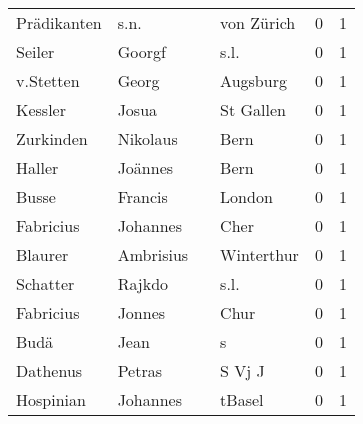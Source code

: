 \begin{center}
\begin{tiny}
\begin{longtabu}{llllrr}
              Prädikanten &                               s.n. &             &                                  von Zürich &          0 &         1 \\
                   Seiler &                             Goorgf &             &                                        s.l. &          0 &         1 \\
                v.Stetten &                              Georg &             &                                    Augsburg &          0 &         1 \\
                  Kessler &                              Josua &             &                                   St Gallen &          0 &         1 \\
                Zurkinden &                           Nikolaus &             &                                        Bern &          0 &         1 \\
                   Haller &                            Joännes &             &                                        Bern &          0 &         1 \\
                    Busse &                            Francis &             &                                      London &          0 &         1 \\
                Fabricius &                           Johannes &             &                                        Cher &          0 &         1 \\
                  Blaurer &                          Ambrisius &             &                                  Winterthur &          0 &         1 \\
                 Schatter &                             Rajkdo &             &                                        s.l. &          0 &         1 \\
                Fabricius &                             Jonnes &             &                                        Chur &          0 &         1 \\
                     Budä &                               Jean &             &                                           s &          0 &         1 \\
                 Dathenus &                             Petras &             &                                      S Vj J &          0 &         1 \\
                Hospinian &                           Johannes &             &                                      tBasel &          0 &         1 \\

\end{longtabu}
\end{tiny}
\end{center}
